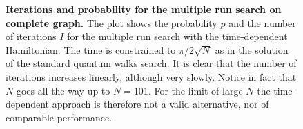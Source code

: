 \begin{figure}[ht]
  \centering
  \caption[]{\textbf{Iterations  and probability  for the multiple run search on complete graph.} The plot shows the probability $p$ and the number of iterations $I$ for the multiple run search with the time-dependent Hamiltonian. The time is constrained to $\pi/2\sqrt{N}$ as in the solution of the standard quantum walks search. It is clear that the number of iterations increases linearly, although very slowly. Notice in fact that $N$ goes all the way up to $N=101$. For the limit of large $N$ the time-dependent approach is therefore not a valid alternative, nor of comparable performance.}
  \label{fig:iterations_complete_graph}
\end{figure}
